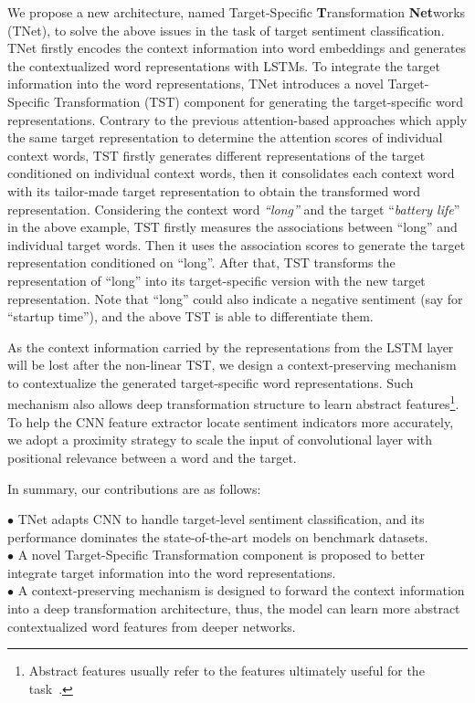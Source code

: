 \documentclass[11pt,a4paper]{article}
\begin{document}
We propose a new architecture, named Target-Specific \textbf{T}ransformation \textbf{Net}works (TNet), to solve the above issues in the task of target sentiment classification. TNet firstly encodes the context information into word embeddings and generates the contextualized word representations with LSTMs. To integrate the target information into the word representations, TNet introduces a novel Target-Specific Transformation (TST) component for generating the target-specific word representations. Contrary to the previous attention-based approaches which apply the same target representation to determine the attention scores of individual context words, TST firstly generates different representations of the target conditioned on individual context words, then it consolidates each context word with its tailor-made target representation to obtain the transformed word representation.
Considering the context word \textit{``long''} and the target ``\textit{battery life}'' in the above example, TST firstly measures the associations between ``long'' and individual target words. Then it uses the association scores to generate the target representation conditioned on ``long''. After that, TST transforms the representation of ``long'' into its target-specific version with the new target representation. Note that ``long'' could also indicate a negative sentiment (say for ``startup time''), and the above TST is able to differentiate them.



As the context information carried by the representations from the LSTM layer will be lost after the non-linear TST, we design a context-preserving mechanism to contextualize the generated target-specific word representations. Such mechanism also allows deep transformation structure to learn abstract features\footnote{Abstract features usually refer to the features ultimately useful for the task~\cite{bengio2013representation,lecun2015deep}.}. 
To help the CNN feature extractor locate sentiment indicators more accurately, we adopt a proximity strategy to scale the input of convolutional layer with positional relevance between a word and the target. 



In summary, our contributions are as follows: 

\indent $\bullet$   TNet adapts CNN to handle target-level sentiment classification, and its performance dominates the state-of-the-art models on benchmark datasets.\\
\indent $\bullet$   A novel Target-Specific Transformation component is proposed to better integrate target information into the word representations.
\\
\indent $\bullet$  A context-preserving mechanism is designed to forward the context information into a deep transformation architecture, thus, the model can learn more abstract contextualized word features from deeper networks.
\end{document}
